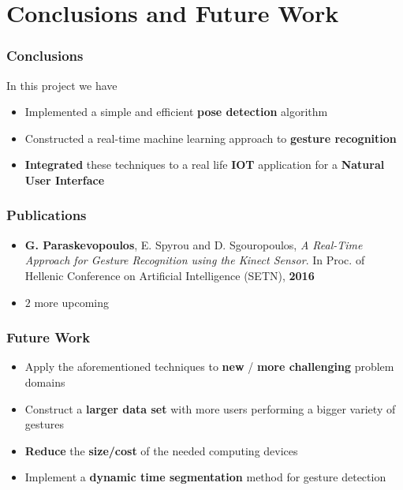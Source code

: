 \section{Conclusions and Future Work}

\begin{frame}
\frametitle{Conclusions}

In this project we have

\begin{itemize}
\item Implemented a simple and efficient \textbf{pose detection} algorithm
\item Constructed a real-time machine learning approach to \textbf{gesture recognition}
\item \textbf{Integrated} these techniques to a real life \textbf{IOT} application for a \textbf{Natural User Interface}
\end{itemize}

\end{frame}

\begin{frame}
\frametitle{Publications}

\begin{itemize}
\item \textbf{G. Paraskevopoulos}, E. Spyrou and D. Sgouropoulos, \textit{A Real-Time Approach for Gesture Recognition using the Kinect Sensor}. In Proc. of Hellenic Conference on Artificial Intelligence (SETN), \textbf{2016}
\item $2$ more upcoming
\end{itemize}

\end{frame}

\begin{frame}
\frametitle{Future Work}

\begin{itemize}
\item Apply the aforementioned techniques to \textbf{new} / \textbf{more challenging} problem domains
\item Construct a \textbf{larger data set} with more users performing a bigger variety of gestures
\item \textbf{Reduce} the \textbf{size/cost} of the needed computing devices
\item Implement a \textbf{dynamic time segmentation} method for gesture detection
\end{itemize}

\end{frame}
